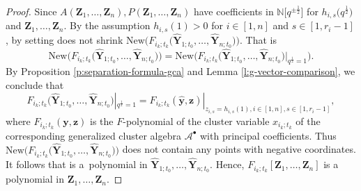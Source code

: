 \documentclass[11pt]{article}
\numberwithin{equation}{section}
\numberwithin{equation}{section}
\begin{document}
\begin{proof}
 Since $A(\mathbf{Z}_{1},\dots,\mathbf{Z}_{n}),P(\mathbf{Z}_{1},\dots,\mathbf{Z}_{n})$ have coefficients in $\mathbb{N}\big[q^{\pm\frac{1}{2}}\big]$ for $h_{i,s}\bigl(q^{\frac{1}{2}}\bigr)$ and $\mathbf{Z}_{1},\dots,\mathbf{Z}_{n}$. By the assumption $h_{i,s}(1)>0$ for $i\in[1,n]$ and $s\in[1,r_{i}-1]$, by setting  does not shrink $\text{New}\bigl(F_{i_{k};t_{k}}\bigl(\mathbf{\hat{Y}}_{1;t_{0}},\dots,\mathbf{\hat{Y}}_{n;t_{0}}\bigr)\bigr)$. That is
 \[
 \text{New}\bigl(F_{i_{k};t_{k}}\bigl(\mathbf{\hat{Y}}_{1;t_{0}},\dots,\mathbf{\hat{Y}}_{n;t_{0}}\bigr)\bigr)
 =\text{New}\bigl(F_{i_{k};t_{k}}\bigl(\mathbf{\hat{Y}}_{1;t_{0}},\dots,\mathbf{\hat{Y}}_{n;t_{0}}\bigr)|_{q^{\frac{1}{2}}=1}\bigr).\]
By Proposition \ref{p:separation-formula-gca} and Lemma \ref{l:g-vector-comparison}, we conclude that \[F_{i_{k};t_{k}}\bigl(\mathbf{\hat{Y}}_{1;t_{0}},\dots,\mathbf{\hat{Y}}_{n;t_{0}}\bigr)|_{q^{\frac{1}{2}}=1}=F_{i_k;t_k}(\mathbf{\hat{y}},\mathbf{z})|_{z_{i,s}=h_{i,s}(1),i\in [1,n],s\in [1,r_i-1]},\] where $F_{i_k;t_k}(\mathbf{y},\mathbf{z})$ is the $F$-polynomial of the cluster variable $x_{i_k;t_k}$ of the corresponding generalized cluster algebra $\mathcal{A}^\bullet$ with principal coefficients.
 Thus $\text{New}\bigl(F_{i_{k};t_{k}}\bigl(\mathbf{\hat{Y}}_{1;t_{0}},\dots,\mathbf{\hat{Y}}_{n;t_{0}}\bigr)\bigr)$ does not contain any points with negative coordinates. It follows that  is a~polynomial in $\mathbf{\hat{Y}}_{1;t_{0}},\dots,\mathbf{\hat{Y}}_{n;t_{0}}$. Hence, $F_{i_{k};t_{k}}[\mathbf{Z}_1,\dots,\mathbf{Z}_{n}]$ is a polynomial in $\mathbf{Z}_{1},\dots,\mathbf{Z}_{n}$.
\end{proof}
\end{document}
